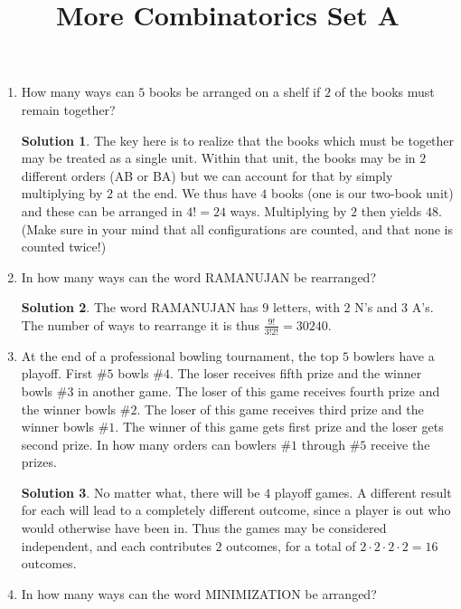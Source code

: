 \documentclass[twocolumn]{article}
\title{More Combinatorics Set A}
\date{}
\author{}
\theoremstyle{definition}
\newtheorem*{solution}{Solution}
\begin{document}
    \maketitle
    \begin{enumerate}
        \item How many ways can $5$ books be arranged on a shelf if $2$ of the books must 
        remain together?
        \begin{solution}
            The key here is to realize that the books which must be together may be treated 
            as a single unit. Within that unit, the books may be in $2$ different orders (AB 
            or BA) but we can account for that by simply multiplying by $2$ at the end. We 
            thus have $4$ books (one is our two-book unit) and these can be arranged in $4! = 
            24$ ways. Multiplying by $2$ then yields $48$. (Make sure in your mind that all 
            configurations are counted, and that none is counted twice!)
        \end{solution}
        \item In how many ways can the word RAMANUJAN be rearranged?
        \begin{solution}
            The word RAMANUJAN has $9$ letters, with $2$ N's and $3$ A's. The number of ways 
            to rearrange it is thus $\frac{9!}{3!2!} = 30240$.
        \end{solution}
        \item At the end of a professional bowling tournament, the top $5$ bowlers have a 
        playoff. First \#$5$ bowls \#$4$. The loser receives fifth prize and the winner 
        bowls \#$3$ in another game. The loser of this game receives fourth prize and the 
        winner bowls \#$2$. The loser of this game receives third prize and the winner bowls 
        \#$1$. The winner of this game gets first prize and the loser gets second prize. 
        In how many orders can bowlers \#$1$ through \#$5$ receive the prizes.
        \begin{solution}
            No matter what, there will be $4$ playoff games. A different result for each 
            will lead to a completely different outcome, since a player is out who would 
            otherwise have been in. Thus the games may be considered independent, and each 
            contributes $2$ outcomes, for a total of $2 \cdot 2 \cdot 2 \cdot 2 = 16$ 
            outcomes.
        \end{solution}
        \item In how many ways can the word MINIMIZATION be arranged?

\end{enumerate}
\end{document}
